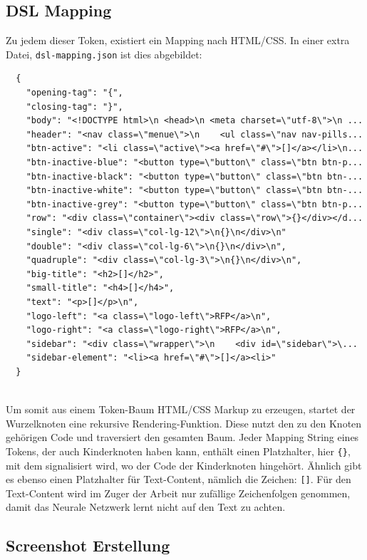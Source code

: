 \documentclass[pdftex,a4paper,halfparskip, article]{scrartcl}
\begin{document}
\subsection{DSL Mapping}

Zu jedem dieser Token, existiert ein Mapping nach HTML/CSS. In einer extra Datei, \texttt{dsl-mapping.json} ist dies abgebildet:

\begin{verbatim}
  {
    "opening-tag": "{",
    "closing-tag": "}",
    "body": "<!DOCTYPE html>\n <head>\n <meta charset=\"utf-8\">\n ...
    "header": "<nav class=\"menue\">\n    <ul class=\"nav nav-pills...
    "btn-active": "<li class=\"active\"><a href=\"#\">[]</a></li>\n...
    "btn-inactive-blue": "<button type=\"button\" class=\"btn btn-p...
    "btn-inactive-black": "<button type=\"button\" class=\"btn btn-...
    "btn-inactive-white": "<button type=\"button\" class=\"btn btn-...
    "btn-inactive-grey": "<button type=\"button\" class=\"btn btn-p...
    "row": "<div class=\"container\"><div class=\"row\">{}</div></d...
    "single": "<div class=\"col-lg-12\">\n{}\n</div>\n"
    "double": "<div class=\"col-lg-6\">\n{}\n</div>\n",
    "quadruple": "<div class=\"col-lg-3\">\n{}\n</div>\n",
    "big-title": "<h2>[]</h2>",
    "small-title": "<h4>[]</h4>",
    "text": "<p>[]</p>\n",
    "logo-left": "<a class=\"logo-left\">RFP</a>\n",
    "logo-right": "<a class=\"logo-right\">RFP</a>\n",
    "sidebar": "<div class=\"wrapper\">\n    <div id=\"sidebar\">\...
    "sidebar-element": "<li><a href=\"#\">[]</a><li>"  
  }
  
\end{verbatim}

Um somit aus einem Token-Baum HTML/CSS Markup zu erzeugen, startet der Wurzelknoten eine rekursive Rendering-Funktion. Diese nutzt den zu den Knoten gehörigen Code und traversiert den gesamten Baum. Jeder Mapping String eines Tokens, der auch Kinderknoten haben kann, enthält einen Platzhalter, hier \texttt{\{\}}, mit dem signalisiert wird, wo der Code der Kinderknoten hingehört. Ähnlich gibt es ebenso einen Platzhalter für Text-Content, nämlich die Zeichen: \texttt{[]}. 
Für den Text-Content wird im Zuger der Arbeit nur zufällige Zeichenfolgen genommen, damit das Neurale Netzwerk lernt nicht auf den Text zu achten. 


\subsection{Screenshot Erstellung}
\end{document}

